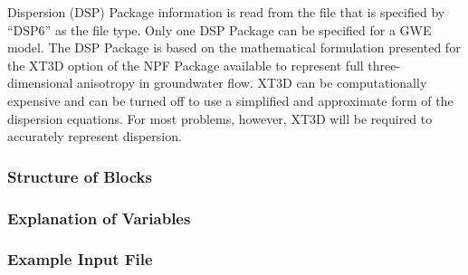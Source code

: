Dispersion (DSP) Package information is read from the file that is specified by ``DSP6'' as the file type.  Only one DSP Package can be specified for a GWE model.  The DSP Package is based on the mathematical formulation presented for the XT3D option of the NPF Package available to represent full three-dimensional anisotropy in groundwater flow.  XT3D can be computationally expensive and can be turned off to use a simplified and approximate form of the dispersion equations.  For most problems, however, XT3D will be required to accurately represent dispersion.

\vspace{5mm}
\subsubsection{Structure of Blocks}



\vspace{5mm}
\subsubsection{Explanation of Variables}
\begin{description}

\end{description}

\vspace{5mm}
\subsubsection{Example Input File}



